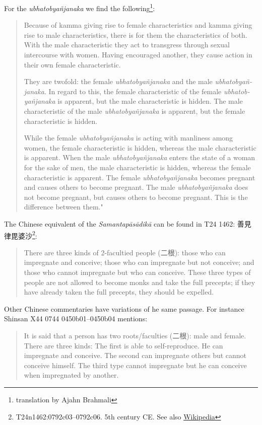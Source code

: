 For the {\em ubhatob­yañ­janaka} we find the following\footnote{translation by Ajahn Brahmali}:

\begin{quote}
Because of kamma giving rise to female characteristics and kamma giving rise to male characteristics, there is for them the characteristics of both. With the male characteristic they act to transgress through sexual intercourse with women. Having encouraged another, they cause action in their own female characteristic. 

They are twofold: the female {\em ubhatob­yañ­janaka} and the male {\em ubhatob­yañ­janaka}. In regard to this, the female characteristic of the female {\em ubhatob­yañ­janaka} is apparent, but the male characteristic is hidden. The male characteristic of the male {\em ubhatob­yañ­janaka} is apparent, but the female characteristic is hidden. 

While the female {\em ubhatob­yañ­janaka} is acting with manliness among women, the female characteristic is hidden, whereas the male characteristic is apparent. 
When the male {\em ubhatob­yañ­janaka} enters the state of a woman for the sake of men, the male characteristic is hidden, whereas the female characteristic is apparent. 
The female {\em ubhatob­yañ­janaka} becomes pregnant and causes others to become pregnant. The male {\em ubhatob­yañ­janaka} does not become pregnant, but causes others to become pregnant. This is the difference between them."
\end{quote}

The Chinese equivalent of the {\em Samantapāsādikā} can be found in T24 1462: 善見律毘婆沙\footnote{T24n1462:0792c03–0792c06. 5th century CE. See also \href{https://zh.wikipedia.org/zh-hk/%E5%96%84%E8%A6%8B%E5%BE%8B%E6%AF%98%E5%A9%86%E6%B2%99}{Wikipedia}}:
\begin{quote}
There are three kinds of 2-facultied people (二根): those who can impregnate and conceive; those who can impregnate but not conceive; and those who cannot impregnate but who can conceive. These three types of people are not allowed to become monks and take the full precepts; if they have already taken the full precepts, they should be expelled.
\end{quote}

Other Chinese commentaries have variations of he same passage. For instance Shinsan X44 0744 0450b01–0450b04 mentions:
\begin{quote}
It is said that a person has two roots/faculties (二根): male and female. There are three kinds: The first is able to self-reproduce. He can impregnate and conceive. The second can impregnate others but cannot conceive himself. The third type cannot impregnate but he can conceive when impregnated by another. 
\end{quote}

